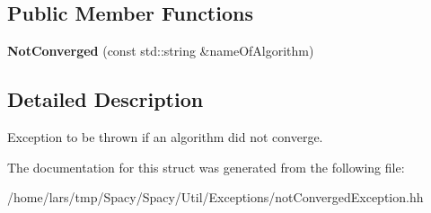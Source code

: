 \subsection*{Public Member Functions}
\begin{DoxyCompactItemize}
\item 
{\bfseries Not\+Converged} (const std\+::string \&name\+Of\+Algorithm)\hypertarget{structSpacy_1_1Exception_1_1NotConverged_ad8da434f7ab60570e598b4e3a659072d}{}\label{structSpacy_1_1Exception_1_1NotConverged_ad8da434f7ab60570e598b4e3a659072d}

\end{DoxyCompactItemize}


\subsection{Detailed Description}
Exception to be thrown if an algorithm did not converge. 

The documentation for this struct was generated from the following file\+:\begin{DoxyCompactItemize}
\item 
/home/lars/tmp/\+Spacy/\+Spacy/\+Util/\+Exceptions/not\+Converged\+Exception.\+hh\end{DoxyCompactItemize}
